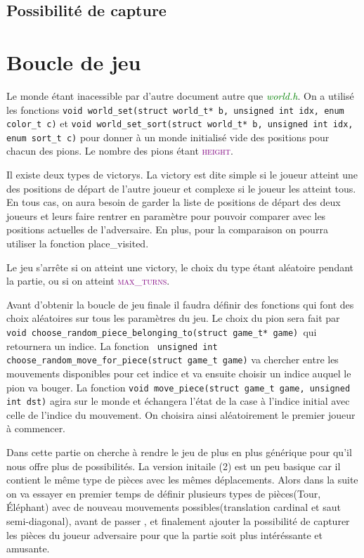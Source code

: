 \documentclass[a4paper]{article}
\begin{document}
\subsection{Possibilité de capture}

\section{Boucle de jeu}
Le monde étant inacessible par d’autre document autre que \textcolor{green}{\textit{world.h}}. On a utilisé les fonctions
 \lstinline|void world_set(struct world_t* b, unsigned int idx, enum color_t c)| et \lstinline|void world_set_sort(struct world_t* b, unsigned int idx, enum sort_t c)|
 pour donner à un monde initialisé vide des positions pour chacun des pions. Le nombre des pions étant \textcolor{purple}{\textsc{height}}.  

Il existe deux types de victorys. La victory est dite simple si le joueur atteint une des positions de départ de l’autre joueur
 et complexe si le joueur les atteint tous. En tous cas, on aura besoin de garder la liste de positions de départ des deux joueurs 
 et leurs faire rentrer en paramètre pour pouvoir comparer avec les positions actuelles de l’adversaire. En plus, pour la comparaison on 
 pourra utiliser la fonction place\_visited. 

Le jeu s’arrête si on atteint une victory, le choix du type étant aléatoire pendant la partie, ou si on atteint \textcolor{purple}{\textsc{max\_turns}}. 

Avant d’obtenir la boucle de jeu finale il faudra définir des fonctions qui font des choix aléatoires sur tous les paramètres du jeu. 
Le choix du pion sera fait par \lstinline|void choose_random_piece_belonging_to(struct game_t* game) |qui retournera un indice. La fonction \lstinline| unsigned int choose_random_move_for_piece(struct game_t game)| va chercher entre les mouvements disponibles pour cet indice et va ensuite choisir un indice auquel le pion va bouger. La fonction \lstinline|void move_piece(struct game_t game, unsigned int dst)| agira sur le monde et échangera l’état de la case à l’indice initial avec celle de l’indice du mouvement. On choisira ainsi aléatoirement le premier joueur à commencer. 

Dans cette partie on cherche à rendre le jeu de plus en plus générique pour qu'il nous offre plus de possibilités. La version initaile (2) est un peu basique car il contient le même type de pièces avec les mêmes déplacements.
Alors dans la suite on va essayer en premier temps de définir plusieurs types de pièces(Tour, Éléphant) avec de nouveau mouvements possibles(translation cardinal et saut semi-diagonal), avant de passer , et finalement ajouter la possibilité de capturer les pièces du joueur adversaire pour que la partie soit plus intéréssante et amusante.
\end{document}
